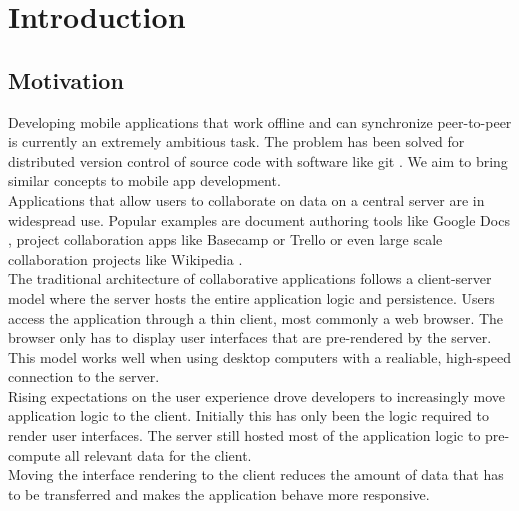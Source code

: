 
\chapter{Introduction}
\label{sec:intro}

\section{Motivation}
Developing mobile applications that work offline and can synchronize peer-to-peer is currently an extremely ambitious task.
The problem has been solved for distributed version control of source code with software like git \cite{git}.
We aim to bring similar concepts to mobile app development.\\

Applications that allow users to collaborate on data on a central server are in widespread use.
Popular examples are document authoring tools like Google Docs \cite{google_docs}, project collaboration apps like Basecamp \cite{basecamp} or Trello \cite{trello} or even large scale collaboration projects like Wikipedia \cite{wikipedia}.\\

The traditional architecture of collaborative applications follows a client-server model where the server hosts the entire application logic and persistence.
Users access the application through a thin client, most commonly a web browser.
The browser only has to display user interfaces that are pre-rendered by the server.\\
This model works well when using desktop computers with a realiable, high-speed connection to the server.\\

Rising expectations on the user experience drove developers to increasingly move application logic to the client.
Initially this has only been the logic required to render user interfaces.
The server still hosted most of the application logic to pre-compute all relevant data for the client.\\
Moving the interface rendering to the client reduces the amount of data that has to be transferred and makes the application behave more responsive.\\


